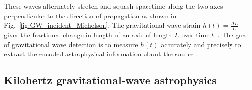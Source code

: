 These waves alternately stretch and squash  spacetime along the two axes perpendicular to the direction of propagation as shown in Fig.~\ref{fig:GW_incident_Michelson}. %
The gravitational-wave strain $h(t)=\frac{\Delta L}{L}$ gives the fractional change in length of an axis of length $L$ over time $t$~\cite{}. The goal of gravitational wave detection is to measure $h(t)$ accurately and precisely to extract the encoded astrophysical information about the source~\cite{}.


\subsection{Kilohertz gravitational-wave astrophysics} %
\label{sec:kilohertz_GW}

